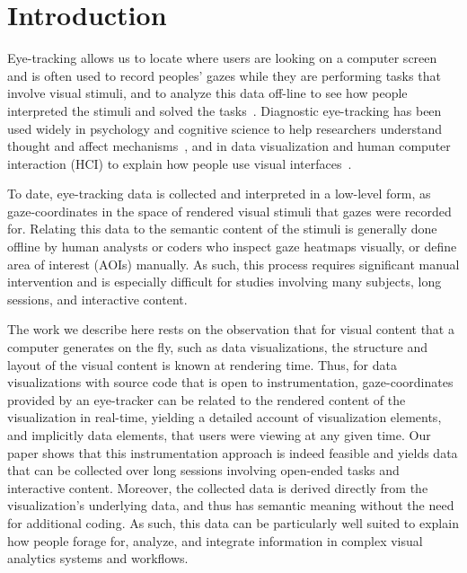 \section{Introduction}

Eye-tracking allows us to locate where users are looking on a computer screen~\cite{ware1987evaluation,jacob1991use} and is often used to record peoples' gazes while they are performing tasks that involve visual stimuli, and to analyze this data off-line to see how people interpreted the stimuli and solved the tasks~\cite{duchowski2007eye}. Diagnostic eye-tracking has been used widely in psychology and cognitive science to help researchers understand thought and affect mechanisms~\cite{rayner1995eye}, and in data visualization and human computer interaction (HCI) to explain how people use visual interfaces~\cite{duchowski2007eye}. 

To date, eye-tracking data is collected and interpreted in a low-level form, as gaze-coordinates in the space of rendered visual stimuli that gazes were recorded for. Relating this data to the semantic content of the stimuli is generally done offline by human analysts or coders who inspect gaze heatmaps visually, or define area of interest (AOIs) manually. As such, this process requires significant manual intervention and is especially difficult for studies involving many subjects, long sessions, and interactive content.

The work we describe here rests on the observation that for visual content that a computer generates on the fly, such as data visualizations, the structure and layout of the visual content is known at rendering time. Thus, for data visualizations with source code that is open to instrumentation, gaze-coordinates provided by an eye-tracker can be related to the rendered content of the visualization in real-time, yielding a detailed account of visualization elements, and implicitly data elements, that users were viewing at any given time. Our paper shows that this instrumentation approach is indeed feasible and yields data that can be collected over long sessions involving open-ended tasks and interactive content. Moreover, the collected data is derived directly from the visualization's underlying data, and thus has semantic meaning without the need for additional coding. As such, this data can be particularly well suited to explain how people forage for, analyze, and integrate information in complex visual analytics systems and workflows. 

